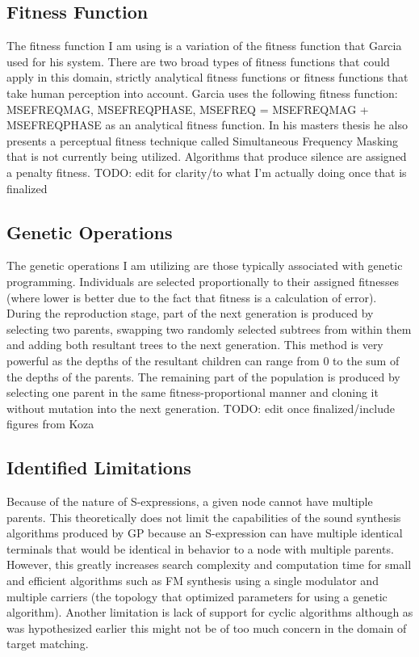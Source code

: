 \documentclass[12pt]{article}
\begin{document}
\subsection{Fitness Function}
The fitness function I am using is a variation of the fitness function that Garcia used for his system. There are two broad types of fitness functions that could apply in this domain, strictly analytical fitness functions or fitness functions that take human perception into account. Garcia uses the following fitness function: MSEFREQMAG, MSEFREQPHASE, MSEFREQ = MSEFREQMAG + MSEFREQPHASE as an analytical fitness function. In his masters thesis he also presents a perceptual fitness technique called Simultaneous Frequency Masking that is not currently being utilized. Algorithms that produce silence are assigned a penalty fitness. TODO: edit for clarity/to what I'm actually doing once that is finalized
\subsection{Genetic Operations}
The genetic operations I am utilizing are those typically associated with genetic programming. Individuals are selected proportionally to their assigned fitnesses (where lower is better due to the fact that fitness is a calculation of error). During the reproduction stage, part of the next generation is produced by selecting two parents, swapping two randomly selected subtrees from within them and adding both resultant trees to the next generation. This method is very powerful as the depths of the resultant children can range from 0 to the sum of the depths of the parents. The remaining part of the population is produced by selecting one parent in the same fitness-proportional manner and cloning it without mutation into the next generation. TODO: edit once finalized/include figures from Koza
\subsection{Identified Limitations}
Because of the nature of S-expressions, a given node cannot have multiple parents. This theoretically does not limit the capabilities of the sound synthesis algorithms produced by GP because an S-expression can have multiple identical terminals that would be identical in behavior to a node with multiple parents. However, this greatly increases search complexity and computation time for small and efficient algorithms such as FM synthesis using a single modulator and multiple carriers (the topology that \citep{horner1993machine} optimized parameters for using a genetic algorithm). Another limitation is lack of support for cyclic algorithms although as was hypothesized earlier this might not be of too much concern in the domain of target matching.
\end{document}
